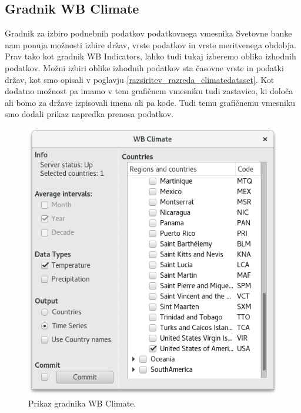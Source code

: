 \subsection{Gradnik WB Climate}

Gradnik za izbiro podnebnih podatkov podatkovnega vmesnika Svetovne banke nam
ponuja možnosti izbire držav, vrste podatkov in vrste meritvenega obdobja.
Prav tako kot gradnik WB Indicators, lahko tudi tukaj izberemo obliko izhodnih
podatkov. Možni izbiri oblike izhodnih podatkov sta časovne vrste in podatki
držav, kot smo opisali v poglavju \ref{razsiritev_razreda_climatedataset}. 
Kot dodatno možnost pa imamo v tem grafičnem vmesniku tudi zastavico, ki 
določa ali bomo za države izpisovali imena ali pa kode. Tudi temu grafičnemu
vmesniku smo dodali prikaz napredka prenosa podatkov.



\begin{figure}
\begin{center}
\includegraphics[width=12cm]{pic/co2_temp_climate_selection.png}
\end{center}
\caption{Prikaz gradnika WB Climate.}
\label{co2_temp_climate}
\end{figure} 
